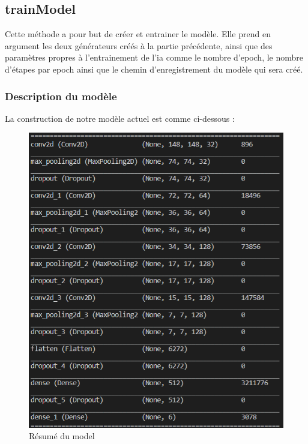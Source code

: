 \documentclass[12pt ,a4paper ]{article}
\begin{document}
\begin{multicols}{2}
\subsection{trainModel}
Cette méthode a pour but de créer et entrainer le modèle. Elle prend en argument les deux générateurs créés à la partie précédente, ainsi que des paramètres propres à l’entrainement de l’ia comme le nombre d’epoch, le nombre d’étapes par epoch ainsi que le chemin d’enregistrement du modèle qui sera créé.\\

\subsubsection{Description du modèle}
La construction de notre modèle actuel est comme ci-dessous : 

\begin{figure}[H]
    \begin{center}
        \includegraphics[scale=0.62]{./img/model_sum.png}
    \end{center}
\caption{\small{Résumé du model}}
\end{figure}


\end{multicols}
\end{document}
